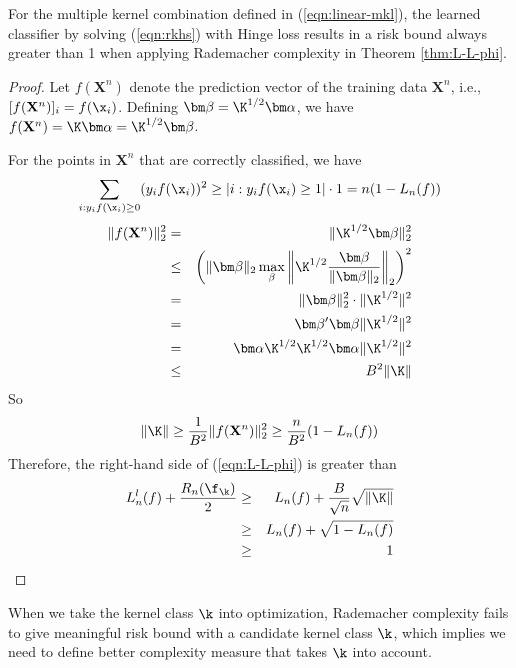 \begin{theorem} \label{thm:rdm-fails}
For the multiple kernel combination defined in (\ref{eqn:linear-mkl}), the learned
classifier by solving (\ref{eqn:rkhs}) with Hinge loss results in a risk bound always
greater than 1 when applying Rademacher complexity in Theorem \ref{thm:L-L-phi}.
\end{theorem}
\begin{proof}
Let $f(\mathbf X^n)$ denote the prediction vector of the training data $\mathbf
X^n$, i.e., $[f(\mathbf X^n)]_i = f(\x_i)$. Defining $\bm\beta = \K^{1/2}\bm\alpha$,
we have $f(\mathbf X^n) = \K\bm\alpha = \K^{1/2}\bm\beta$.

For the points in $\mathbf X^n$ that are correctly classified, we have
\[
\sum_{i: y_if(\x_i) \geq 0} (y_if(\x_i))^2 \geq | i: y_if(\x_i) \geq 1|\cdot 1 = n(1 - L_n(f))
\]
\begin{eqnarray}
\| f(\mathbf X^n) \|_2^2 &=& \| \K^{1/2}\bm\beta \|^2_2 \nonumber\\
&\leq& \bigg(\| \bm\beta \|_2 \max_{\beta}\bigg\| \K^{1/2} \frac{\bm\beta}{\|\bm\beta\|_2} \bigg\|_2\bigg)^2 \nonumber\\
&=& \| \bm\beta \|_2^2 \cdot\| \K^{1/2} \|^2 \nonumber\\
&=& \bm\beta'\bm\beta\| \K^{1/2} \|^2 \nonumber\\
&=& \bm\alpha \K^{1/2}\K^{1/2}\bm\alpha\| \K^{1/2} \|^2 \nonumber\\
&\leq& B^2\| \K \| \nonumber
\end{eqnarray}
So
\[
\| \K \| \geq \frac{1}{B^2}\|f(\mathbf X^n)\|^2_2 \geq \frac{n}{B^2}(1 - L_n(f))
\]
Therefore, the right-hand side of (\ref{eqn:L-L-phi}) is greater than
\begin{eqnarray}
L^l_n(f) + \frac{R_n(\f_\k)}{2} &\geq& L_n(f) + \frac{B}{\sqrt{n}} \sqrt{\|\K\|} \nonumber\\
&\geq& L_n(f) + \sqrt{1 - L_n(f)} \nonumber\\
&\geq& 1  \nonumber
\end{eqnarray}
\end{proof}


\begin{remark} \label{rmk:rdmchr-fails}
When we take the kernel class $\k$ into optimization, Rademacher complexity fails to give meaningful risk bound with a candidate kernel
class $\k$, which implies we need to define better complexity measure
that takes $\k$ into account.
\end{remark}

